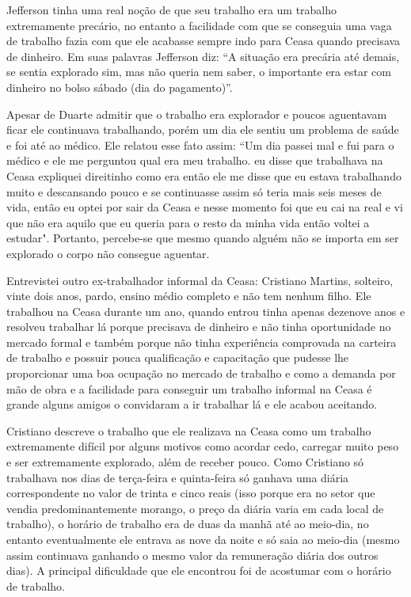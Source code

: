  Jefferson tinha uma real noção de que seu trabalho era um trabalho extremamente precário, no entanto
 a facilidade com que se conseguia uma vaga de trabalho fazia com que ele acabasse sempre indo para
 Ceasa quando precisava de dinheiro. Em suas palavras Jefferson diz: “A situação era precária até demais,
 se sentia explorado sim, mas não queria nem saber, o importante era estar com dinheiro no bolso sábado
 (dia do pagamento)”.

 Apesar de Duarte admitir que o trabalho era explorador e poucos aguentavam ficar ele continuava 
 trabalhando, porém um dia ele sentiu um problema de saúde e foi até ao médico. Ele relatou esse fato
 assim: “Um dia passei mal e fui para o médico e ele me perguntou qual era meu trabalho. eu disse que 
 trabalhava na Ceasa expliquei direitinho como era então ele me disse que eu estava trabalhando muito 
 e descansando pouco e se continuasse assim só teria mais seis meses de vida, então eu optei por sair 
 da Ceasa e nesse momento foi que eu cai na real e vi que não era aquilo que eu queria para o resto da 
 minha vida então voltei a estudar". Portanto, percebe-se que mesmo quando alguém não se importa em ser
 explorado o corpo não consegue aguentar.

 Entrevistei outro ex-trabalhador informal da Ceasa: Cristiano Martins, solteiro, vinte dois anos, 
 pardo, ensino médio completo e não tem nenhum filho. Ele trabalhou na Ceasa durante um ano, quando 
 entrou tinha apenas dezenove anos e resolveu trabalhar lá porque precisava de dinheiro e não tinha 
 oportunidade no mercado formal e também porque não tinha experiência comprovada na carteira de trabalho
 e possuir pouca qualificação e capacitação que pudesse lhe proporcionar uma boa ocupação no mercado de
 trabalho e como a demanda por mão de obra e a facilidade para conseguir um trabalho informal na Ceasa
 é grande alguns amigos o convidaram a ir trabalhar lá e ele acabou aceitando.

 
 Cristiano descreve o trabalho que ele realizava na Ceasa como um trabalho extremamente difícil por 
 alguns motivos como acordar cedo, carregar muito peso e ser extremamente explorado, além de receber 
 pouco. Como Cristiano só trabalhava nos dias de terça-feira e quinta-feira só ganhava uma diária 
 correspondente no valor de trinta e cinco reais (isso porque era no setor que vendia predominantemente 
 morango, o preço da diária varia em cada local de trabalho), o horário de trabalho era de duas da manhã 
 até ao meio-dia, no entanto eventualmente ele entrava as nove da noite e só saia ao meio-dia (mesmo 
 assim continuava ganhando o mesmo valor da remuneração diária dos outros dias). A principal dificuldade
 que ele encontrou foi de acostumar com o horário de trabalho.

